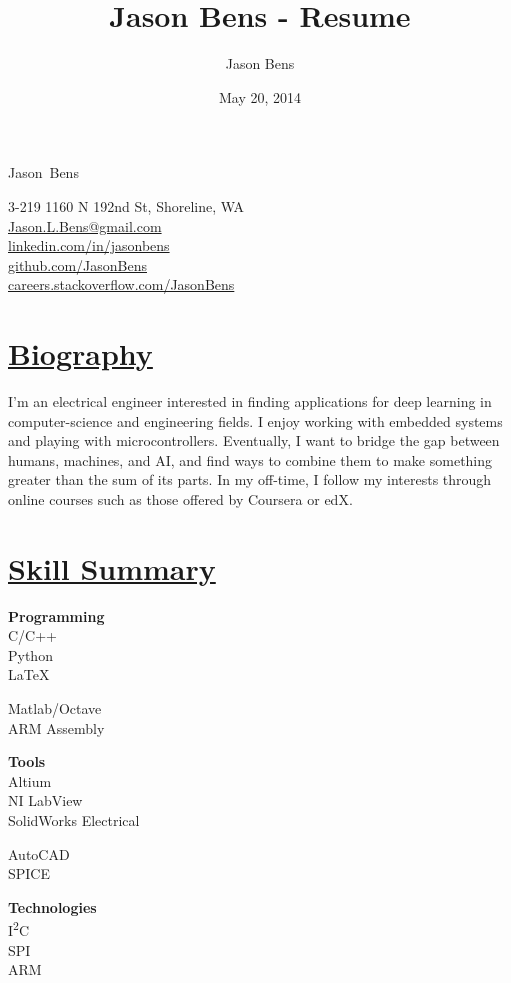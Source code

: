 \documentclass[a4paper, 11pt]{article}
\title{Jason Bens - Resume}
\author{Jason Bens}
\date{May 20, 2014}
\makeatletter
\newcommand {\firstname} {Jason}
\newcommand {\lastname} {Bens}
\newcommand {\address} {3-219 1160 N 192nd St, Shoreline, WA}
\newcommand {\phone} {\mbox{1-403-845-9125}}
\newcommand {\email} {\url{Jason.L.Bens@gmail.com}}
\newcommand {\linkedin} {\url{linkedin.com/in/jasonbens}}
\newcommand {\github} {\url{github.com/JasonBens}}
\newcommand {\careers} {\url{careers.stackoverflow.com/JasonBens}}
\makeatother
\begin{document}


\begin{minipage}[t]{0.4\textwidth}  
  \begin{flushright}
    {\Huge \firstname~\lastname}
  \end{flushright}
\end{minipage}
\hfill
\begin{minipage}{0.42\textwidth}
  \begin{flushright}
    \address \\
    \email \\
    \linkedin \\
    \github \\
    \careers \\
  \end{flushright}
\end{minipage}

\hrulefill

\section{\underline{Biography}}
I'm an electrical engineer interested in finding applications for deep learning in computer-science and engineering fields. I enjoy working with embedded systems and playing with microcontrollers. Eventually, I want to bridge the gap between humans, machines, and AI, and find ways to combine them to make something greater than the sum of its parts. In my off-time, I follow my interests through online courses such as those offered by Coursera or edX.

\section{\underline{Skill Summary}}
  \parbox{0.16\textwidth}{
    \textbf{Programming}\\
    C/C++\\
    Python\\
    \LaTeX
  } 
  \parbox{0.18\textwidth}{
    \bigskip
    Matlab/Octave\\
    ARM Assembly\\
    \hfill
  } \hfill
  \parbox{0.23\textwidth}{
    \textbf{Tools}\\
    Altium\\
    NI LabView\\
    SolidWorks Electrical
  }
  \parbox{0.14\textwidth}{
    \bigskip
    AutoCAD\\
    SPICE\\
    \hfill
  } \hfill
  \parbox{0.15\textwidth}{
    \textbf{Technologies}\\
    I\textsuperscript{2}C\\
    SPI\\
    ARM
  } \hfill
  \medskip
  
\end{document}
